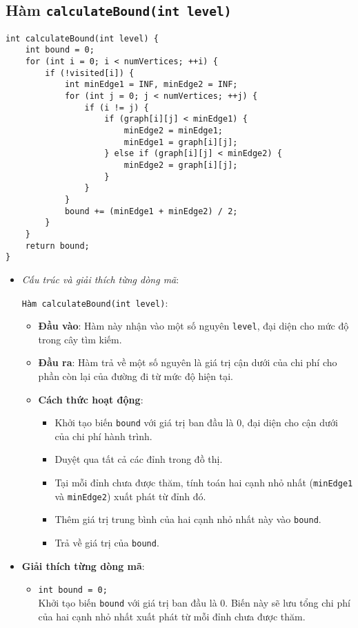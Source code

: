 \documentclass[a4paper]{article}
\begin{document}
\begin{itemize}
\subsection*{Hàm \texttt{calculateBound(int level)}}
\begin{lstlisting}[style=cppstyle]
int calculateBound(int level) {
    int bound = 0;
    for (int i = 0; i < numVertices; ++i) {
        if (!visited[i]) {
            int minEdge1 = INF, minEdge2 = INF;
            for (int j = 0; j < numVertices; ++j) {
                if (i != j) {
                    if (graph[i][j] < minEdge1) {
                        minEdge2 = minEdge1;
                        minEdge1 = graph[i][j];
                    } else if (graph[i][j] < minEdge2) {
                        minEdge2 = graph[i][j];
                    }
                }
            }
            bound += (minEdge1 + minEdge2) / 2;
        }
    }
    return bound;
}
\end{lstlisting}


\begin{itemize}
\item \textit{Cấu trúc và giải thích từng dòng mã}:

\texttt{Hàm \texttt{calculateBound(int level)}}:
\begin{itemize}
\item \textbf{Đầu vào}: Hàm này nhận vào một số nguyên \texttt{level}, đại diện cho mức độ trong cây tìm kiếm.
\item \textbf{Đầu ra}: Hàm trả về một số nguyên là giá trị cận dưới của chi phí cho phần còn lại của đường đi từ mức độ hiện tại.
\item \textbf{Cách thức hoạt động}:
\begin{itemize}
\item Khởi tạo biến \texttt{bound} với giá trị ban đầu là 0, đại diện cho cận dưới của chi phí hành trình.
\item Duyệt qua tất cả các đỉnh trong đồ thị.
\item Tại mỗi đỉnh chưa được thăm, tính toán hai cạnh nhỏ nhất (\texttt{minEdge1} và \texttt{minEdge2}) xuất phát từ đỉnh đó.
\item Thêm giá trị trung bình của hai cạnh nhỏ nhất này vào \texttt{bound}.
\item Trả về giá trị của \texttt{bound}.
\end{itemize}
\end{itemize}
\end{itemize}

\begin{itemize}
\item \textbf{Giải thích từng dòng mã}:
\begin{itemize}
    \item \texttt{int bound = 0;} \\
    Khởi tạo biến \texttt{bound} với giá trị ban đầu là 0. Biến này sẽ lưu tổng chi phí của hai cạnh nhỏ nhất xuất phát từ mỗi đỉnh chưa được thăm.


\end{itemize}
\end{itemize}
\end{itemize}
\end{document}
